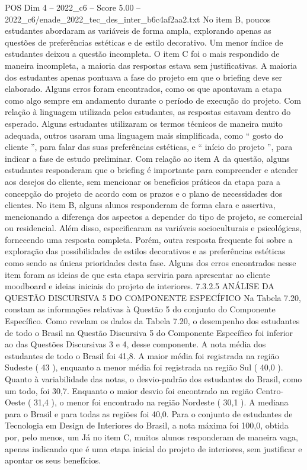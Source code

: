 \begin{textsample}{POS Dim 4 – 2022\_c6 – Score 5.00 – 2022\_c6/enade\_2022\_tec\_des\_inter\_b6c4af2aa2.txt}
No item B, poucos estudantes abordaram as variáveis de forma ampla, explorando apenas as questões de preferências estéticas e de estilo decorativo.
Um menor índice de estudantes deixou a questão incompleta.
O item C foi o mais respondido de maneira incompleta, a maioria das respostas estava sem justificativas.
A maioria dos estudantes apenas pontuava a fase do projeto em que o briefing deve ser elaborado.
Alguns erros foram encontrados, como os que apontavam a etapa como algo sempre em andamento durante o período de execução do projeto.
Com relação à linguagem utilizada pelos estudantes, as respostas estavam dentro do esperado.
Alguns estudantes utilizaram os termos técnicos de maneira muito adequada, outros usaram uma linguagem mais simplificada, como “ gosto do cliente ”, para falar das suas preferências estéticas, e “ início do projeto ”, para indicar a fase de estudo preliminar.
Com relação ao item A da questão, alguns estudantes responderam que o briefing é importante para compreender e atender aos desejos do cliente, sem mencionar os benefícios práticos da etapa para a concepção do projeto de acordo com os prazos e o plano de necessidades dos clientes.
No item B, alguns alunos responderam de forma clara e assertiva, mencionando a diferença dos aspectos a depender do tipo de projeto, se comercial ou residencial.
Além disso, especificaram as variáveis socioculturais e psicológicas, fornecendo uma resposta completa.
Porém, outra resposta frequente foi sobre a exploração das possibilidades de estilos decorativos e as preferências estéticas como sendo as únicas prioridades desta fase.
Alguns dos erros encontrados nesse item foram as ideias de que esta etapa serviria para apresentar ao cliente moodboard e ideias iniciais do projeto de interiores. 7.3.2.5 ANÁLISE DA QUESTÃO DISCURSIVA 5 DO COMPONENTE ESPECÍFICO Na Tabela 7.20, constam as informações relativas à Questão 5 do conjunto do Componente Específico.
Como revelam os dados da Tabela 7.20, o desempenho dos estudantes de todo o Brasil na Questão Discursiva 5 do Componente Específico foi inferior ao das Questões Discursivas 3 e 4, desse componente.
A nota média dos estudantes de todo o Brasil foi 41,8.
A maior média foi registrada na região Sudeste ( 43 ), enquanto a menor média foi registrada na região Sul ( 40,0 ).
Quanto à variabilidade das notas, o desvio-padrão dos estudantes do Brasil, como um todo, foi 30,7.
Enquanto o maior desvio foi encontrado na região Centro-Oeste ( 31,4 ), o menor foi encontrado na região Nordeste ( 30,1 ).
A mediana para o Brasil e para todas as regiões foi 40,0.
Para o conjunto de estudantes de Tecnologia em Design de Interiores do Brasil, a nota máxima foi 100,0, obtida por, pelo menos, um Já no item C, muitos alunos responderam de maneira vaga, apenas indicando que é uma etapa inicial do projeto de interiores, sem justificar e apontar os seus benefícios.

\end{textsample}
